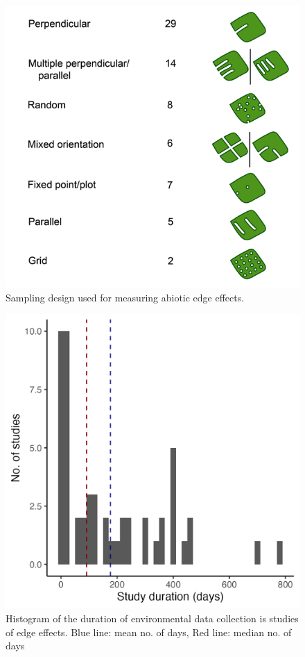 \documentclass[
  man]{apa6}
\begin{document}
\begin{figure}[H]

{\centering \includegraphics[width=0.9\linewidth,]{images/temp_00013} 

}

\caption{Sampling design used for measuring abiotic edge effects.}\label{fig:sampling}
\end{figure}

\begin{figure}[H]

{\centering \includegraphics[width=0.8\linewidth,]{images/duration_hist_eb} 

}

\caption{Histogram of the duration of environmental data collection is studies of edge effects. Blue line: mean no. of days, Red line: median no. of days}\label{fig:duration}
\end{figure}
\end{document}
